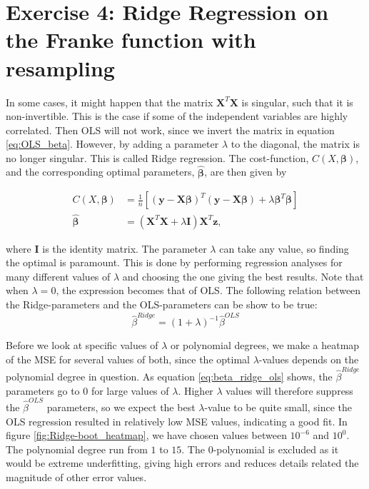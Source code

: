 \documentclass[reprint,english,notitlepage,aps,nobalancelastpage,nofootinbib]{revtex4-1}  %
\newcommand{\vc}[1]{\mathbf{#1}}
\begin{document}
\section*{Exercise 4: Ridge Regression on the Franke function with resampling}
In some cases, it might happen that the matrix $\mathbf{X}^T\mathbf{X}$ is singular, such that it is non-invertible. This is the case if some of the independent variables are highly correlated. Then OLS will not work, since we invert the matrix in equation \eqref{eq:OLS_beta}. However, by adding a parameter $\lambda$ to the diagonal, the matrix is no longer singular. This is called Ridge regression. The cost-function, $C(X,\bm{\beta})$, and the corresponding optimal parameters, $\boldsymbol{\hat\beta}$, are then given by

\begin{align*}
	C(X,\boldsymbol\beta) &= \frac{1}{n} \left[ \left(\mathbf{y}-\mathbf{X}\boldsymbol\beta\right)^T \left(\mathbf{y}-\mathbf{X}\boldsymbol\beta\right) + \lambda\boldsymbol\beta^T\boldsymbol\beta \right]
	\\
	\boldsymbol{\hat{\beta}} &= (\mathbf{X}^T\mathbf{X}+\lambda \mathbf{I})\mathbf{X}^T\vc{z},
\end{align*}

where $\mathbf{I}$ is  the identity matrix. The parameter $\lambda$ can take any value, so finding the optimal is paramount. This is done by performing regression analyses for many different values of $\lambda$ and choosing the one giving the best results. Note that when $\lambda=0$, the expression becomes that of OLS. The following relation between the Ridge-parameters and the OLS-parameters can be show to be true:
\begin{equation}\label{eq:beta_ridge_ols}
	\hat{\beta}^{Ridge} = (1 + \lambda)^{-1}\hat{\beta}^{OLS}
\end{equation}

Before we look at specific values of $\lambda$ or polynomial degrees, we make a heatmap of the MSE for several values of both, since the optimal $\lambda$-values depends on the polynomial degree in question. As equation \eqref{eq:beta_ridge_ols} shows, the $\hat{\beta}^{Ridge}$ parameters go to $0$ for large values of $\lambda$. Higher $\lambda$ values will therefore suppress the $\hat{\beta}^{OLS}$ parameters, so we expect the best $\lambda$-value to be quite small, since the OLS regression resulted in relatively low MSE values, indicating a good fit. In figure \ref{fig:Ridge-boot_heatmap}, we have chosen values between $10^{-6}$ and $10^0$. The polynomial degree run from $1$ to $15$. The 0-polynomial is excluded as it would be extreme underfitting, giving high errors and reduces details related the magnitude of other error values.
\end{document}
